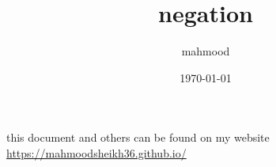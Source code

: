 \documentclass[a4paper,12pt]{article}
\author{mahmood}
\date{\today}
\title{negation}
\begin{document}
\maketitle
\begin{note}
this document and others can be found on my website\\
\url{https://mahmoodsheikh36.github.io/}
\end{note}
\end{document}
